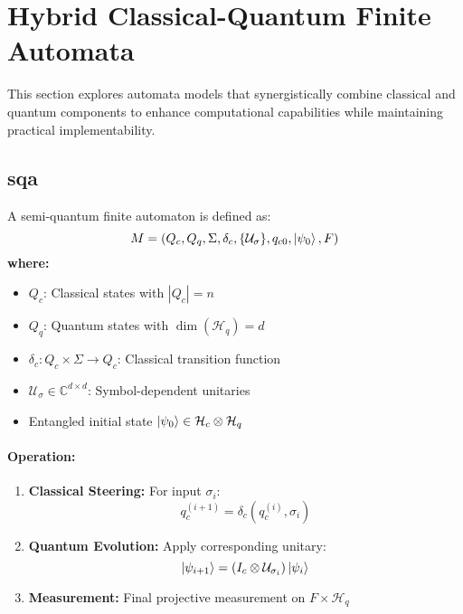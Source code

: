 \section{Hybrid Classical-Quantum Finite Automata}
\label{sec:hybrid-qfa}

This section explores automata models that synergistically combine classical and quantum components to enhance computational capabilities while maintaining practical implementability.

\subsection{\acrfull{sqa}}
\label{subsec:sqa}

\begin{definition}
A semi-quantum finite automaton is defined as:
\[
M = (Q_c, Q_q, \Sigma, \delta_c, \{\mathcal{U}_\sigma\}, q_{c0}, \ket{\psi_0}, F)
\]
\textbf{where:}
\begin{itemize}
    \item $Q_c$: Classical states with $|Q_c| = n$
    \item $Q_q$: Quantum states with $\dim(\mathcal{H}_q) = d$
    \item $\delta_c: Q_c \times \Sigma \rightarrow Q_c$: Classical transition function
    \item $\mathcal{U}_\sigma \in \mathbb{C}^{d \times d}$: Symbol-dependent unitaries
    \item Entangled initial state $\ket{\psi_0} \in \mathcal{H}_c \otimes \mathcal{H}_q$
\end{itemize}
\end{definition}

\paragraph{Operation:}
\begin{enumerate}
    \item \textbf{Classical Steering:} For input $\sigma_i$:
    \[
    q_c^{(i+1)} = \delta_c(q_c^{(i)}, \sigma_i)
    \]
    \item \textbf{Quantum Evolution:} Apply corresponding unitary:
    \[
    \ket{\psi_{i+1}} = (I_c \otimes \mathcal{U}_{\sigma_i}) \ket{\psi_i}
    \]
    \item \textbf{Measurement:} Final projective measurement on $F \times \mathcal{H}_q$
\end{enumerate}

